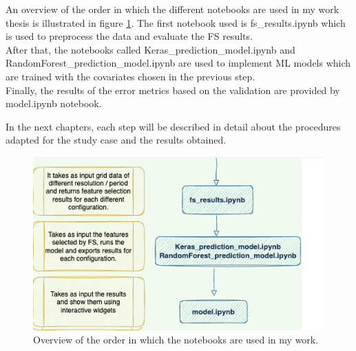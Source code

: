 An overview of the order in which the different notebooks are used in my work thesis is illustrated in figure \ref{fig:notebooks}.
The first notebook used is fs\_results.ipynb which is used to preprocess the data and evaluate the FS results. \\
After that, the notebooks called Keras\_prediction\_model.ipynb and RandomForest\_prediction\_model.ipynb are used to implement ML models which are trained with the covariates chosen in the previous step. \\
Finally, the results of the error metrics based on the validation are provided by model.ipynb notebook. 
\par
In the next chapters, each step will be described in detail about the procedures adapted for the study case and the results obtained.
\begin{figure}[H]
    \centering
    \includegraphics[scale=0.40]{images/overview _notebooks.png}
    \caption{Overview of the order in which the notebooks are used in my work.}
    \label{fig:notebooks}
\end{figure}